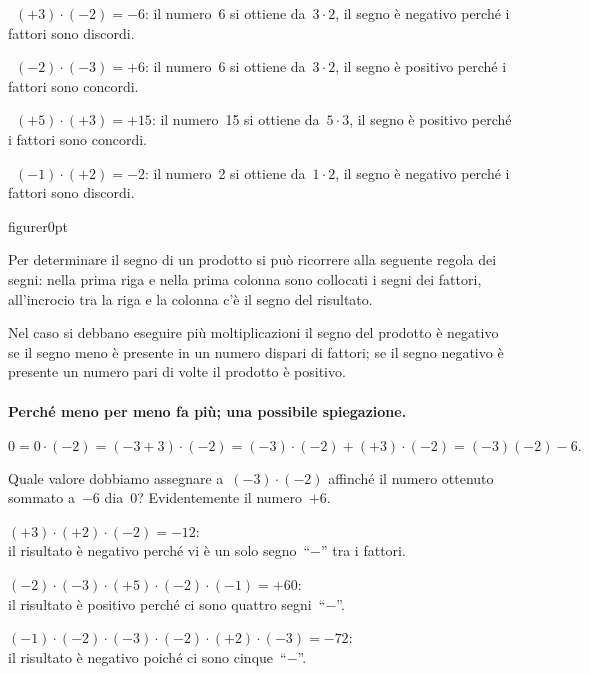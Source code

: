 \begin{exrig}
 \begin{esempio}
~$(+3)\cdot(-2)=-6$: il numero~6 si ottiene da~$3\cdot2$, il segno è negativo 
perché i fattori sono discordi.
 \end{esempio}

 \begin{esempio}
~$(-2)\cdot(-3)=+6$: il numero~6 si ottiene da~$3\cdot2$, il segno è positivo 
perché i fattori sono concordi.
 \end{esempio}
 \begin{esempio}
~$(+5)\cdot(+3)=+15$: il numero~15 si ottiene da~$5\cdot3$, il segno è positivo 
perché i fattori sono concordi.
 \end{esempio}
 \begin{esempio}
~$(-1)\cdot(+2)=-2$: il numero~2 si ottiene da~$1\cdot2$, il segno è negativo 
perché i fattori sono discordi.
 \end{esempio}

\end{exrig}

\begin{wrapfloat}{figure}{r}{0pt}

\end{wrapfloat}
Per determinare il segno di un prodotto si può ricorrere alla seguente regola 
dei segni: nella prima riga e
nella prima colonna sono collocati i segni dei fattori, all'incrocio tra la riga 
e la colonna c'è il segno
del risultato.

Nel caso si debbano eseguire più moltiplicazioni il segno del prodotto è 
negativo se il segno meno è presente
in un numero dispari di fattori; se il segno negativo è presente un numero pari 
di volte il prodotto è positivo.

\paragraph{Perché meno per meno fa più; una possibile spiegazione.}
\[0=0\cdot (-2) = (-3+3)\cdot (-2) = (-3)\cdot(-2)+(+3)\cdot(-2)=(-3)(-2)-6.\]

Quale valore dobbiamo assegnare a~$(-3)\cdot(-2)$ affinché il numero ottenuto 
sommato a~$-6$ dia~0?
Evidentemente il numero~$+6$.

\begin{exrig}
 \begin{esempio}
$(+3)\cdot (+2)\cdot (-2) =-12$: \\
il risultato è negativo perché vi è un solo segno~``$-$'' tra i fattori.
 \end{esempio}

 \begin{esempio}
$(-2)\cdot (-3)\cdot (+5)\cdot (-2)\cdot (-1) = +60$: \\ 
il risultato è positivo perché ci sono quattro segni~``$-$''.
 \end{esempio}

 \begin{esempio}
$(-1)\cdot (-2)\cdot (-3)\cdot (-2)\cdot (+2)\cdot (-3) = -72$: \\ 
il risultato è negativo poiché ci sono cinque~``$-$''.
 \end{esempio}
\end{exrig}

